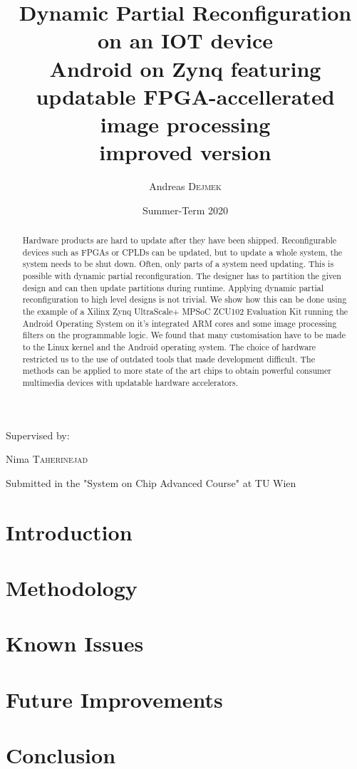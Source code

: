 \documentclass{article}
\title{Dynamic Partial Reconfiguration on an IOT device\\
\vspace{1em}
Android on Zynq featuring updatable FPGA-accellerated image processing \\ improved version }
\author{Andreas \textsc{Dejmek}}
\date{Summer-Term 2020}
\newcommand{\note}[1]{\todo[inline,linecolor=red,backgroundcolor=yellow!25,bordercolor=black]{AD: #1}}
\begin{document}
\maketitle
\begin{center}
	Supervised by:

	Nima \textsc{Taherinejad}
	
\end{center}
\begin{abstract}
	Hardware products are hard to update after they have been shipped.
	Reconfigurable devices such as FPGAs or CPLDs can be updated, but to
	update a whole system, the system needs to be shut down.
	Often, only parts of a system need updating.
	This is possible with dynamic partial reconfiguration.
	The designer has to partition the given design and can then update
	partitions during runtime.
	Applying dynamic partial reconfiguration to high level designs is not
	trivial.
	We show how this can be done using the example of a Xilinx Zynq UltraScale+ MPSoC ZCU102 Evaluation Kit running the
	Android Operating System on it's integrated ARM cores and some image
	processing filters on the programmable logic.
	We found that many customisation have to be made to the Linux kernel
	and the Android operating system.
	The choice of hardware restricted us to the use of outdated tools that
	made development difficult.
	The methods can be applied to more state of the art chips to obtain
	powerful consumer multimedia devices with updatable hardware
	accelerators.
	\note{reword for new project}
\end{abstract}
\begin{center}
	Submitted in the "System on Chip Advanced Course" at TU Wien


\end{center}
\pagebreak
\tableofcontents
\pagebreak

\section{Introduction}\label{sec:introduction}

%
\section{Methodology}\label{sec:methodology}

%
\section{Known Issues}\label{sec:knownissues}

%
\section{Future Improvements}\label{sec:futureimprovements}

%
\section{Conclusion}\label{sec:conclusion}




\end{document}
